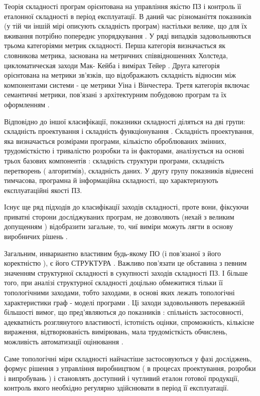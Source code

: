 Теорія складності програм орієнтована на управління якістю ПЗ і контроль її еталонної складності в період експлуатації. В даний час різноманіття показників (у тій чи іншій мірі описують складність програм) настільки велике, що для їх вживання потрібно попереднє упорядкування . У ряді випадків задовольняються трьома категоріями метрик складності. Перша категорія визначається як словникова метрика, заснована на метричних співвідношеннях Холстеда, цикломатическая заходи Мак- Кейба і вимірах Тейер . Друга категорія орієнтована на метрики зв'язків, що відображають складність відносин між компонентами системи - це метрики Уіна і Вінчестера. Третя категорія включає семантичні метрики, пов'язані з архітектурним побудовою програм та їх оформленням .

Відповідно до іншої класифікації, показники складності діляться на дві групи: складність проектування і складність функціонування . Складність проектування, яка визначається розмірами програми, кількістю оброблюваних змінних, трудомісткістю і тривалістю розробки та ін факторами, аналізується на основі трьох базових компонентів : складність структури програми, складність перетворень ( алгоритмів), складність даних. У другу групу показників віднесені тимчасова, програмна й інформаційна складності, що характеризують експлуатаційні якості ПЗ.

Існує ще ряд підходів до класифікації заходів складності, проте вони, фіксуючи приватні сторони досліджуваних програм, не дозволяють (нехай з великим допущенням ) відобразити загальне, то, чиї виміри можуть лягти в основу виробничих рішень .

Загальним, инвариантно властивим будь-якому ПО (і пов'язаної з його коректністю ), є його СТРУКТУРА . Важливо пов'язати це обставина з певним значенням структурної складності в сукупності заходів складності ПЗ. І більше того, при аналізі структурної складності доцільно обмежитися тільки її топологічними заходами, тобто заходами, в основі яких лежать топологічні характеристики граф - моделі програми . Ці заходи задовольняють переважній більшості вимог, що пред'являються до показників : спільність застосовності, адекватність розглянутого властивості, істотність оцінки, спроможність, кількісне вираження, відтворюваність вимірювань, мала трудомісткість обчислень, можливість автоматизації оцінювання .

Саме топологічні міри складності найчастіше застосовуються у фазі досліджень, формує рішення з управління виробництвом ( в процесах проектування, розробки і випробувань ) і становлять доступний і чутливий еталон готової продукції, контроль якого необхідно регулярно здійснювати в період її експлуатації.

